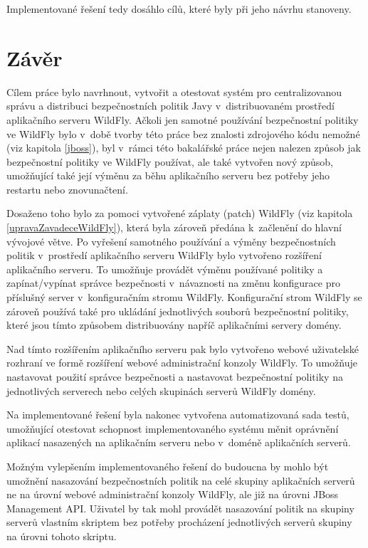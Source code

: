 Implementované řešení tedy dosáhlo cílů, které byly při jeho návrhu stanoveny.

\chapter{Závěr}

Cílem práce bylo navrhnout, vytvořit a otestovat systém pro centralizovanou správu a distribuci bezpečnostních politik Javy v~distribuovaném prostředí aplikačního serveru WildFly.
Ačkoli jen samotné používání bezpečnostní politiky ve WildFly bylo v~době tvorby této práce bez znalosti zdrojového kódu nemožné (viz kapitola \ref{jboss}),
byl v~rámci této bakalářské práce nejen nalezen způsob jak bezpečnostní politiky ve WildFly používat, ale také vytvořen nový způsob, umožňující také její výměnu za běhu aplikačního serveru bez potřeby jeho restartu nebo znovunačtení.

Dosaženo toho bylo za pomoci vytvořené záplaty (patch) WildFly (viz kapitola \ref{upravaZavadeceWildFly}), která byla zároveň předána
k~začlenění do hlavní vývojové větve. \cite{jmPullRequest}
Po vyřešení samotného používání a výměny bezpečnostních politik v~prostředí aplikačního serveru WildFly bylo vytvořeno rozšíření aplikačního serveru.
To umožňuje provádět výměnu používané politiky a zapínat/vypínat správce bezpečnosti v~návaznosti na změnu konfigurace pro příslušný server
v~konfiguračním stromu WildFly.
Konfigurační strom WildFly se zároveň používá také pro ukládání jednotlivých souborů bezpečnostní politiky, které jsou tímto způsobem distribuovány napříč aplikačními servery domény.

Nad tímto rozšířením aplikačního serveru pak bylo vytvořeno webové uživatelské rozhraní ve formě rozšíření webové administrační konzoly WildFly.
To umožňuje nastavovat použití správce bezpečnosti a nastavovat bezpečnostní politiky na jednotlivých serverech nebo celých skupinách serverů WildFly domény.

Na implementované řešení byla nakonec vytvořena automatizovaná sada testů, umožňující otestovat schopnost implementovaného systému měnit oprávnění
aplikací nasazených na aplikačním serveru nebo v~doméně aplikačních serverů.

Možným vylepšením implementovaného řešení do budoucna by mohlo být umožnění nasazování bezpečnostních politik na celé skupiny aplikačních serverů ne na úrovní webové administrační konzoly WildFly, ale již na úrovni JBoss Management API. Uživatel by tak mohl provádět nasazování politik na skupiny serverů vlastním skriptem bez potřeby procházení jednotlivých serverů skupiny na úrovni tohoto skriptu.

